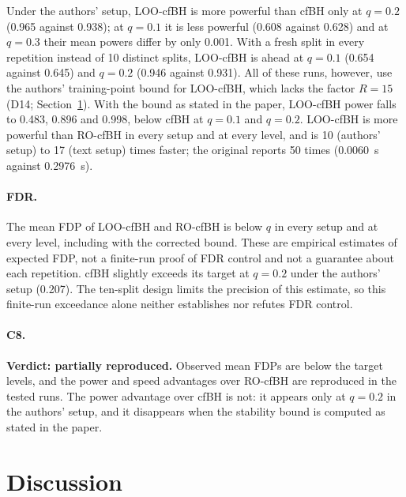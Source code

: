 Under the authors' setup, LOO-cfBH is more powerful than cfBH only at $q=0.2$ (0.965 against 0.938); at $q=0.1$ it is
less powerful (0.608 against 0.628) and at $q=0.3$ their mean powers differ by only 0.001. With a fresh split in every repetition instead of
10 distinct splits, LOO-cfBH is ahead at $q=0.1$ (0.654 against 0.645) and $q=0.2$ (0.946 against 0.931). All of these runs, however, use the authors' training-point bound for LOO-cfBH, which
lacks the factor $R=15$ (D14; Section~\ref{sec:discussion}). With the bound as stated in the paper, LOO-cfBH power
falls to 0.483, 0.896 and 0.998, below cfBH at $q=0.1$ and $q=0.2$. LOO-cfBH is more powerful than RO-cfBH in every
setup and at every level, and is 10 (authors' setup) to 17 (text setup) times faster; the original reports 50 times
(0.0060~s against 0.2976~s).

\paragraph{FDR.} The mean FDP of LOO-cfBH and RO-cfBH is below $q$ in every setup and at every level, including with
the corrected bound. These are empirical estimates of expected FDP, not a finite-run proof of FDR control and not a guarantee about each repetition. cfBH slightly exceeds its target at $q=0.2$ under the authors' setup (0.207). The ten-split design limits the precision of this estimate, so this finite-run exceedance alone neither establishes nor refutes FDR control.

\paragraph{C8.} \textbf{Verdict: partially reproduced.} Observed mean FDPs are below the target levels, and the power and speed advantages over RO-cfBH are reproduced in the tested runs. The power advantage over cfBH is not: it appears only at $q=0.2$ in the authors' setup, and
it disappears when the stability bound is computed as stated in the paper.

\section{Discussion}
\label{sec:discussion}

